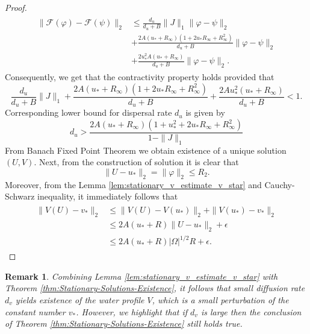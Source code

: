\documentclass[12pt, a4paper]{article}
\theoremstyle{break}
\theoremstyle{break}
\theoremstyle{break}
\theoremstyle{break}
\newtheorem{rem}{Remark}[section]
\theoremstyle{break}
\theoremstyle{break}
\theoremstyle{break}
\begin{document}
\begin{proof}
\begin{align}
        \label{eq:contraactivity-l2-1}
        \begin{split}
            \|\mathcal{F}(\varphi) - \mathcal{F}(\psi)\|_2
            &\leq
            \frac{d_u}{d_u + B} \|J\|_1 \|\varphi - \psi\|_2 \\
            &+ \frac{2A(u_* + R_\infty)
        \left( 1 + 2u_*R_\infty + R^2_\infty \right)}{d_u + B} \|\varphi - \psi\|_2 \\
            &+ \frac{2u_*^2A(u_* + R_\infty)}{d_u + B} \|\varphi - \psi\|_2.
        \end{split}
    \end{align}
    Consequently, we get that the contractivity property holds provided that
    \begin{equation}
        \frac{d_u}{d_u + B} \|J\|_1 + 
        \frac{2A(u_* + R_\infty)
        \left( 1 + 2u_*R_\infty + R^2_\infty \right)}{d_u + B} +
        \frac{2A u_*^2(u_* + R_\infty)}{d_u + B} <
        1.
    \end{equation}
    Corresponding lower bound for dispersal rate $d_u$ is given by
    \begin{equation}
        d_u > \frac{2A(u_* + R_\infty)
        \left( 1 + u_*^2 + 2u_*R_\infty + R^2_\infty \right)}{1 - \|J\|_1}
    \end{equation}
    From Banach Fixed Point Theorem we obtain existence of a unique solution $(U, V)$. 
    Next, from the construction of solution it is clear that 
    \begin{equation}
        \|U - u_*\|_2 = \|\varphi\|_2 \leq R_2.
    \end{equation}
    Moreover, from the Lemma \ref{lem:stationary_v_estimate_v_star} and Cauchy-Schwarz inequality, it immediately follows that
    \begin{align}
        \begin{split}
            \|V(U) - v_*\|_2 
            &\leq \|V(U) - V(u_*)\|_2 + \|V(u_*) - v_*\|_2 \\
            &\leq 2A(u_* + R)\|U-u_*\|_2 + \epsilon \\
            &\leq 2A(u_* + R)|\Omega|^{1/2} R + \epsilon.     
        \end{split}
    \end{align}
\end{proof}

\begin{rem}
    Combining Lemma \ref{lem:stationary_v_estimate_v_star} with Theorem \ref{thm:Stationary-Solutions-Existence}, it follows that small diffusion rate $d_v$ yields existence of the water profile $V$, which is a small perturbation of the constant number $v_*$. However, we highlight that if $d_v$ is large then the conclusion of Theorem \ref{thm:Stationary-Solutions-Existence} still holds true.
\end{rem}
\end{document}
